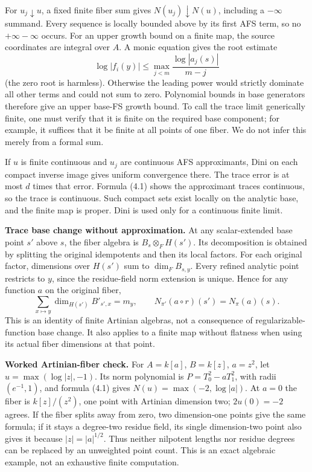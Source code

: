 \documentclass[
  10pt,
]{article}
\begin{document}
For \(u_j\downarrow u\), a fixed finite fiber sum gives
\(N(u_j)\downarrow
N(u)\), including a \(-\infty\) summand. Every sequence is locally
bounded above by its first AFS term, so no \(+\infty-\infty\) occurs.
For an upper growth bound on a finite map, the source coordinates are
integral over \(A\). A monic equation gives the root estimate
\[\log|f_i(y)|\le\max_{j<m}\frac{\log|a_j(s)|}{m-j}\] (the zero root is
harmless). Otherwise the leading power would strictly dominate all other
terms and could not sum to zero. Polynomial bounds in base generators
therefore give an upper base-FS growth bound. To call the trace limit
generically finite, one must verify that it is finite on the required
base component; for example, it suffices that it be finite at all points
of one fiber. We do not infer this merely from a formal sum.

If \(u\) is finite continuous and \(u_j\) are continuous AFS
approximants, Dini on each compact inverse image gives uniform
convergence there. The trace error is at most \(d\) times that error.
Formula (4.1) shows the approximant traces continuous, so the trace is
continuous. Such compact sets exist locally on the analytic base, and
the finite map is proper. Dini is used only for a continuous finite
limit.

\textbf{Trace base change without approximation.} At any scalar-extended
base point \(s'\) above \(s\), the fiber algebra is
\(B_s\otimes_FH(s')\). Its decomposition is obtained by splitting the
original idempotents and then its local factors. For each original
factor, dimensions over \(H(s')\) sum to \(\dim_F B_{s,y}\). Every
refined analytic point restricts to \(y\), since the residue-field norm
extension is unique. Hence for any function \(a\) on the original fiber,
\[\sum_{x\mapsto y}\dim_{H(s')}B'_{s',x}=m_y,\qquad
 N_{\pi'}(a\circ r)(s')=N_\pi(a)(s).\tag{4.2}\] This is an identity of
finite Artinian algebras, not a consequence of regularizable-function
base change. It also applies to a finite map without flatness when using
its actual fiber dimensions at that point.

\textbf{Worked Artinian-fiber check.} For \(A=k[a]\), \(B=k[z]\),
\(a=z^2\), let \(u=\max(\log|z|,-1)\). Its norm polynomial is
\(P=T_0^2-aT_1^2\), with radii \((e^{-1},1)\), and formula (4.1) gives
\(N(u)=\max(-2,\log|a|)\). At \(a=0\) the fiber is \(k[z]/(z^2)\), one
point with Artinian dimension two; \(2u(0)=-2\) agrees. If the fiber
splits away from zero, two dimension-one points give the same formula;
if it stays a degree-two residue field, its single dimension-two point
also gives it because \(|z|=|a|^{1/2}\). Thus neither nilpotent lengths
nor residue degrees can be replaced by an unweighted point count. This
is an exact algebraic example, not an exhaustive finite computation.
\end{document}
